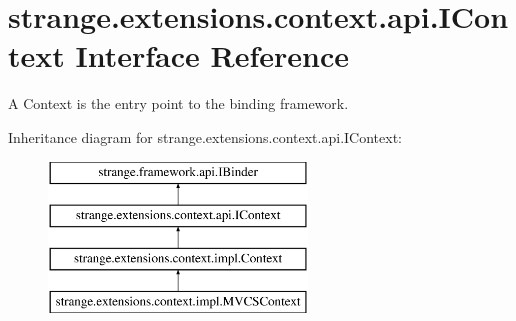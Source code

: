 \hypertarget{interfacestrange_1_1extensions_1_1context_1_1api_1_1_i_context}{\section{strange.\-extensions.\-context.\-api.\-I\-Context Interface Reference}
\label{interfacestrange_1_1extensions_1_1context_1_1api_1_1_i_context}
}


A Context is the entry point to the binding framework.  


Inheritance diagram for strange.\-extensions.\-context.\-api.\-I\-Context\-:\begin{figure}[H]
\begin{center}
\leavevmode
\includegraphics[height=4.000000cm]{interfacestrange_1_1extensions_1_1context_1_1api_1_1_i_context}
\end{center}
\end{figure}

